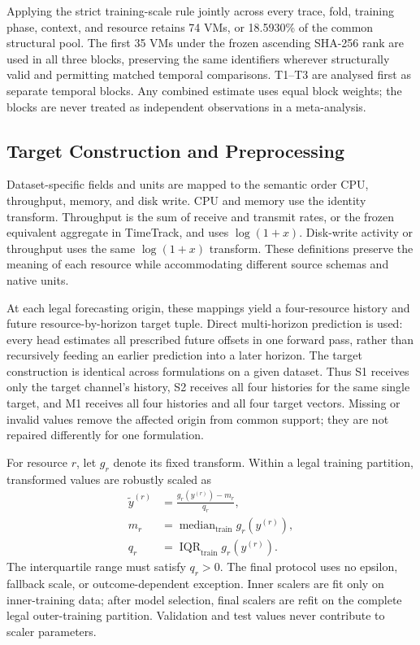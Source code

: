 \documentclass[a4paper,11pt]{article}
\begin{document}
Applying the strict training-scale rule jointly across every trace, fold, training phase,
context, and resource retains 74 VMs, or 18.5930\% of the common structural
pool.  The first 35 VMs under the frozen ascending SHA-256 rank are used in all
three blocks, preserving the same identifiers wherever structurally valid and
permitting matched temporal comparisons.  T1--T3 are analysed first as
separate temporal blocks.  Any combined estimate uses equal block weights;
the blocks are never treated as independent observations in a meta-analysis.

\subsection*{Target Construction and Preprocessing}


Dataset-specific fields and units are mapped to the semantic order CPU,
throughput, memory, and disk write.  CPU and memory use the identity transform.
Throughput is the sum of receive and transmit rates, or the frozen equivalent
aggregate in TimeTrack, and uses $\log(1+x)$.  Disk-write activity or throughput
uses the same $\log(1+x)$ transform.  These definitions preserve the meaning of
each resource while accommodating different source schemas and native units.

At each legal forecasting origin, these mappings yield a four-resource history
and future resource-by-horizon target tuple.  Direct multi-horizon prediction is
used: every head estimates all prescribed future offsets in one forward pass,
rather than recursively feeding an earlier prediction into a later horizon.
The target construction is identical across formulations on a given dataset.
Thus S1 receives only the target channel's history, S2 receives all four
histories for the same single target, and M1 receives all four histories and
all four target vectors.  Missing or invalid values remove the affected origin
from common support; they are not repaired differently for one formulation.

For resource $r$, let $g_r$ denote its fixed transform.  Within a legal
training partition, transformed values are robustly scaled as
\begin{equation}
  \begin{aligned}
    \widetilde{y}^{(r)}
      &= \frac{g_r(y^{(r)})-m_r}{q_r}, \\
    m_r &= \operatorname{median}_{\mathrm{train}} g_r(y^{(r)}), \\
    q_r &= \operatorname{IQR}_{\mathrm{train}} g_r(y^{(r)}).
  \end{aligned}
  \label{eq:robust-scaling}
\end{equation}
The interquartile range must satisfy $q_r>0$.  The final protocol uses no
epsilon, fallback scale, or outcome-dependent exception.  Inner scalers are fit
only on inner-training data; after model selection, final scalers are refit on
the complete legal outer-training partition.  Validation and test values never
contribute to scaler parameters.
\end{document}
